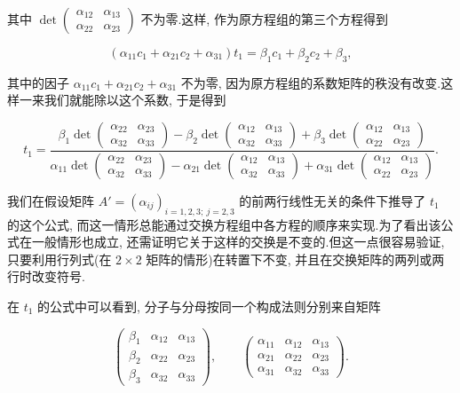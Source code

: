 其中 $\det\begin{pmatrix} \alpha_{12} & \alpha_{13} \\ \alpha_{22} & \alpha_{23} \end{pmatrix}$ 不为零.这样, 作为原方程组的第三个方程得到

\[
(\alpha_{11} c_1 + \alpha_{21} c_2 + \alpha_{31}) t_1 = \beta_1 c_1 + \beta_2 c_2 + \beta_3,
\]

其中的因子 $\alpha_{11} c_1 + \alpha_{21} c_2 + \alpha_{31}$ 不为零, 因为原方程组的系数矩阵的秩没有改变.这样一来我们就能除以这个系数, 于是得到

\[
t_1 = \frac{\beta_1 \det\begin{pmatrix} \alpha_{22} & \alpha_{23} \\ \alpha_{32} & \alpha_{33} \end{pmatrix} - \beta_2 \det\begin{pmatrix} \alpha_{12} & \alpha_{13} \\ \alpha_{32} & \alpha_{33} \end{pmatrix} + \beta_3 \det\begin{pmatrix} \alpha_{12} & \alpha_{13} \\ \alpha_{22} & \alpha_{23} \end{pmatrix}}{\alpha_{11} \det\begin{pmatrix} \alpha_{22} & \alpha_{23} \\ \alpha_{32} & \alpha_{33} \end{pmatrix} - \alpha_{21} \det\begin{pmatrix} \alpha_{12} & \alpha_{13} \\ \alpha_{32} & \alpha_{33} \end{pmatrix} + \alpha_{31} \det\begin{pmatrix} \alpha_{12} & \alpha_{13} \\ \alpha_{22} & \alpha_{23} \end{pmatrix}}.
\]

我们在假设矩阵 $A' = (\alpha_{ij})_{i = 1, 2, 3;\ j = 2, 3}$ 的前两行线性无关的条件下推导了 $t_1$ 的这个公式, 而这一情形总能通过交换方程组中各方程的顺序来实现.为了看出该公式在一般情形也成立, 还需证明它关于这样的交换是不变的.但这一点很容易验证, 只要利用行列式(在 $2 \times 2$ 矩阵的情形)在转置下不变, 并且在交换矩阵的两列或两行时改变符号.

在 $t_1$ 的公式中可以看到, 分子与分母按同一个构成法则分别来自矩阵

\[
\begin{pmatrix} \beta_1 & \alpha_{12} & \alpha_{13} \\ \beta_2 & \alpha_{22} & \alpha_{23} \\ \beta_3 & \alpha_{32} & \alpha_{33} \end{pmatrix}, \qquad \begin{pmatrix} \alpha_{11} & \alpha_{12} & \alpha_{13} \\ \alpha_{21} & \alpha_{22} & \alpha_{23} \\ \alpha_{31} & \alpha_{32} & \alpha_{33} \end{pmatrix}.
\]

